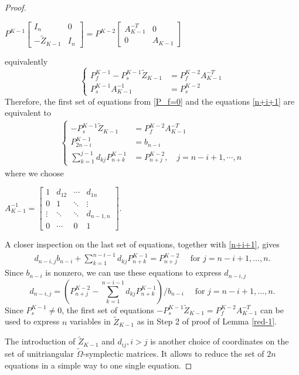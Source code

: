 \documentclass[10pt]{amsart}
\theoremstyle{remark}
\begin{document}
\begin{proof}
\begin{center}
    $P^{K-1} \left[\begin{array}{ccc} I_n & 0 \\ -\tilde{Z}_{K-1} & I_n\end{array}\right] = P^{K-2} \left[\begin{array}{ccc} A^{-T}_{K-1} & 0 \\ 0 & A_{K-1}\end{array}\right]$
\end{center}
equivalently
\begin{equation}
\begin{cases}
    P^{K-1}_f - P^{K-1}_s \tilde{Z}_{K-1} &= P^{K-2}_f A^{-T}_{K-1} \\
    P^{K-1}_{s} A^{-1}_{K-1} &= P^{K-2}_{s} 
\end{cases}  
\end{equation}
Therefore, the first set of equations from \eqref{P_f=0} and the equations \eqref{n+i+1} are equivalent to 
\begin{align*}
    \begin{cases}
        - P^{K-1}_s \tilde{Z}_{K-1} &= P^{K-2}_f A^{-T}_{K-1} \\
        P^{K-1}_{2n-i} &= b_{n-i} \\
        \sum^{j-1}_{k=1}d_{kj}P^{K-1}_{n+k} & = P^{K-2}_{n+j}, \quad j = n-i+1, \cdots, n  
    \end{cases}
\end{align*}
where we choose 
\begin{center}
     $A^{-1}_{K-1}  = \left[\begin{array}{cccc} 1 & d_{12} & \cdots & d_{1n} \\  0 & 1 & \ddots & \vdots \\
    \vdots & \ddots & \ddots & d_{n-1,n} \\
    0 & \cdots & 0 & 1\end{array}\right]$.
\end{center}
A closer inspection on the last set of equations, together with \eqref{n+i+1}, gives
\begin{align}
    d_{n-i,j} b_{n-i} + \sum^{n-i-1}_{k=1}d_{kj}P^{K-1}_{n+k} = P^{K-2}_{n+j}  \quad \text{ for } j = n-i+1, \dots, n. 
\end{align}
Since $b_{n-i}$ is nonzero, we can use these equations to express $d_{n-i,j}$
\[
     d_{n-i,j} =  (P^{K-2}_{n+j} - \sum^{n-i-1}_{k=1}d_{kj}P^{K-1}_{n+k})/b_{n-i}  \quad  \text{ for } j = n-i+1, \dots, n. 
\]
Since $P^{K-1}_s \neq 0$, the first set of equations $- P^{K-1}_s \tilde{Z}_{K-1} = P^{K-2}_f A^{-T}_{K-1}$ can be used to express $n$ variables in $\tilde{Z}_{K-1}$ as in Step 2 of proof of Lemma \ref{red-1}. 

The introduction of $\tilde{Z}_{K-1}$ and $d_{ij}, i>j$ is another choice of coordinates on the set of unitriangular $\tilde{\Omega}$-symplectic matrices. It allows to reduce the set of $2n$ equations in a simple way to one single equation. 
\end{proof}
\end{document}
